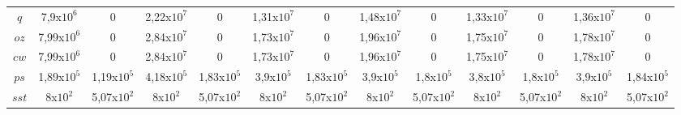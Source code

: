 \begin{table}[H]
\begin{center}
\begin{adjustbox}{max width=\textwidth}
\begin{tabular}{ccccccccccccc}
\multicolumn{1}{c}{$q$}    & \multicolumn{1}{c}{7,9x$10^{6}$} & \multicolumn{1}{c}{0} & \multicolumn{1}{c}{2,22x$10^{7}$} & \multicolumn{1}{c}{0} & \multicolumn{1}{c}{1,31x$10^{7}$} & \multicolumn{1}{c}{0} & \multicolumn{1}{c}{1,48x$10^{7}$} & \multicolumn{1}{c}{0} & \multicolumn{1}{c}{1,33x$10^{7}$} & \multicolumn{1}{c}{0} & \multicolumn{1}{c}{1,36x$10^{7}$} & \multicolumn{1}{c}{0} \\ 
\multicolumn{1}{c}{$oz$}   & \multicolumn{1}{c}{7,99x$10^{6}$} & \multicolumn{1}{c}{0} & \multicolumn{1}{c}{2,84x$10^{7}$} & \multicolumn{1}{c}{0} & \multicolumn{1}{c}{1,73x$10^{7}$} & \multicolumn{1}{c}{0} & \multicolumn{1}{c}{1,96x$10^{7}$} & \multicolumn{1}{c}{0} & \multicolumn{1}{c}{1,75x$10^{7}$} & \multicolumn{1}{c}{0} & \multicolumn{1}{c}{1,78x$10^{7}$} & \multicolumn{1}{c}{0} \\ 
\multicolumn{1}{c}{$cw$}   & \multicolumn{1}{c}{7,99x$10^{6}$} & \multicolumn{1}{c}{0} & \multicolumn{1}{c}{2,84x$10^{7}$} & \multicolumn{1}{c}{0} & \multicolumn{1}{c}{1,73x$10^{7}$} & \multicolumn{1}{c}{0} & \multicolumn{1}{c}{1,96x$10^{7}$} & \multicolumn{1}{c}{0} & \multicolumn{1}{c}{1,75x$10^{7}$} & \multicolumn{1}{c}{0} & \multicolumn{1}{c}{1,78x$10^{7}$} & \multicolumn{1}{c}{0} \\ 
\multicolumn{1}{c}{$ps$}   & \multicolumn{1}{c}{1,89x$10^{5}$} & \multicolumn{1}{c}{1,19x$10^{5}$} & \multicolumn{1}{c}{4,18x$10^{5}$} & \multicolumn{1}{c}{1,83x$10^{5}$} & \multicolumn{1}{c}{3,9x$10^{5}$} & \multicolumn{1}{c}{1,83x$10^{5}$} & \multicolumn{1}{c}{3,9x$10^{5}$} & \multicolumn{1}{c}{1,8x$10^{5}$} & \multicolumn{1}{c}{3,8x$10^{5}$} & \multicolumn{1}{c}{1,8x$10^{5}$} & \multicolumn{1}{c}{3,9x$10^{5}$} & \multicolumn{1}{c}{1,84x$10^{5}$} \\ 
\multicolumn{1}{c}{$sst$}  & \multicolumn{1}{c}{8x$10^{2}$} & \multicolumn{1}{c}{5,07x$10^{2}$} & \multicolumn{1}{c}{8x$10^{2}$} & \multicolumn{1}{c}{5,07x$10^{2}$} & \multicolumn{1}{c}{8x$10^{2}$} & \multicolumn{1}{c}{5,07x$10^{2}$} & \multicolumn{1}{c}{8x$10^{2}$} & \multicolumn{1}{c}{5,07x$10^{2}$} & \multicolumn{1}{c}{8x$10^{2}$} & \multicolumn{1}{c}{5,07x$10^{2}$} & \multicolumn{1}{c}{8x$10^{2}$} & \multicolumn{1}{c}{5,07x$10^{2}$} \\ 
\bottomrule
\end{tabular}
\end{adjustbox}
\end{center}
\label{tab:comphorizmaxminB}
\end{table}

